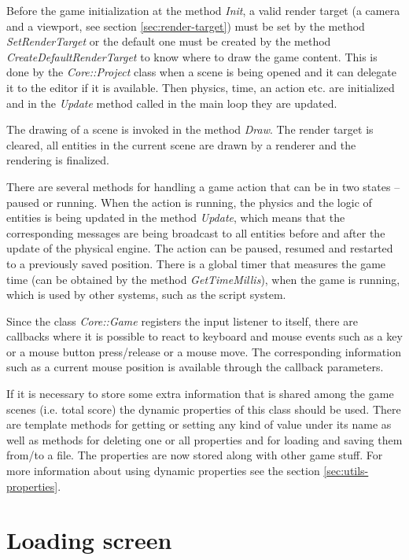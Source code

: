 \documentclass[a4paper, 12pt]{report}
\begin{document}
Before the game initialization at the method \emph{Init}, a valid render target (a camera and a viewport, see section \ref{sec:render-target}) must be set by the method \emph{SetRenderTarget} or the default one must be created by the method \emph{CreateDefaultRenderTarget} to know where to draw the game content. This is done by the \emph{Core::Project} class when a scene is being opened and it can delegate it to the editor if it is available. Then physics, time, an action etc. are initialized and in the \emph{Update} method called in the main loop they are updated.

The drawing of a scene is invoked in the method \emph{Draw}. The render target is cleared, all entities in the current scene are drawn by a renderer and the rendering is finalized.

There are several methods for handling a game action that can be in two states -- paused or running. When the action is running, the physics and the logic of entities is being updated in the method \emph{Update}, which means that the corresponding messages are being broadcast to all entities before and after the update of the physical engine. The action can be paused, resumed and restarted to a previously saved position. There is a global timer that measures the game time (can be obtained by the method \emph{GetTimeMillis}), when the game is running, which is used by other systems, such as the script system.

Since the class \emph{Core::Game} registers the input listener to itself, there are callbacks where it is possible to react to keyboard and mouse events such as a key or a mouse button press/release or a mouse move. The corresponding information such as a current mouse position is available through the callback parameters.

If it is necessary to store some extra information that is shared among the game scenes (i.e. total score) the dynamic properties of this class should be used. There are template methods for getting or setting any kind of value under its name as well as methods for deleting one or all properties and for loading and saving them from/to a file. The properties are now stored along with other game stuff. For more information about using dynamic properties see the section \ref{sec:utils-properties}.

\section{Loading screen}
\end{document}
